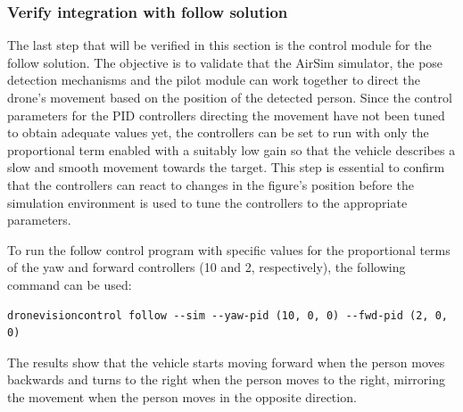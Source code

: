 \subsubsection{Verify integration with follow solution}

The last step that will be verified in this section is the control module for the follow solution. The objective is to validate that the AirSim simulator, the pose detection mechanisms and the pilot module can work together to direct the drone's movement based on the position of the detected person. Since the control parameters for the PID controllers directing the movement have not been tuned to obtain adequate values yet, the controllers can be set to run with only the proportional term enabled with a suitably low gain so that the vehicle describes a slow and smooth movement towards the target. This step is essential to confirm that the controllers can react to changes in the figure's position before the simulation environment is used to tune the controllers to the appropriate parameters.

To run the follow control program with specific values for the proportional terms of the yaw and forward controllers (10 and 2, respectively), the following command can be used:

\begin{verbatim}
dronevisioncontrol follow --sim --yaw-pid (10, 0, 0) --fwd-pid (2, 0, 0)
\end{verbatim}

The results show that the vehicle starts moving forward when the person moves backwards and turns to the right when the person moves to the right, mirroring the movement when the person moves in the opposite direction.


